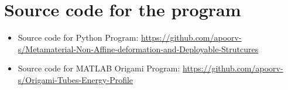 \chapter{Source code for the program}

\begin{itemize}
    \item Source code for Python Program: \href{https://github.com/apoorv-s/Metamaterial-Non-Affine-deformation-and-Deployable-Strutcures}{https://github.com/apoorv-s/Metamaterial-Non-Affine-deformation-and-Deployable-Strutcures}
    \item Source code for MATLAB Origami Program: \href{https://github.com/apoorv-s/Origami-Tubes-Energy-Profile}{https://github.com/apoorv-s/Origami-Tubes-Energy-Profile}
\end{itemize}
